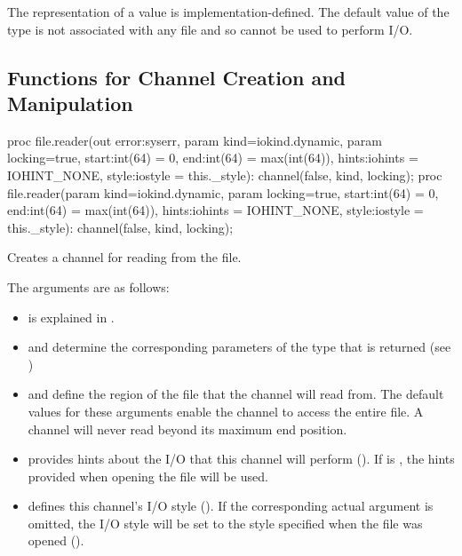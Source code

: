 The representation of a  value is implementation-defined.
The default value of the  type is not associated
with any file and so cannot be used to perform I/O.


\subsection{Functions for Channel Creation and Manipulation}
\label{IO_channel_creation}

\begin{protohead}
proc file.reader(out error:syserr, param kind=iokind.dynamic, param locking=true,
                 start:int(64) = 0, end:int(64) = max(int(64)), hints:iohints = IOHINT_NONE,
                 style:iostyle = this._style): channel(false, kind, locking);
proc file.reader(param kind=iokind.dynamic, param locking=true,
                 start:int(64) = 0, end:int(64) = max(int(64)), hints:iohints = IOHINT_NONE,
                 style:iostyle = this._style): channel(false, kind, locking);
\end{protohead}
\begin{protobody}
Creates a channel for reading from the file.

The arguments are as follows:

\begin{itemize}

\item {} is explained in .

\item {} and  determine the corresponding parameters of
      the  type that is returned (see )

\item {} and  define the region of the file that
      the channel will read from. The default values for these arguments enable
      the channel to access the entire file.
      A channel will never read beyond its maximum end position.

\item {} provides hints about the I/O that this channel
      will perform ().
      If  is , the hints provided when opening
      the file will be used.

\item {} defines this channel's I/O style ().
      If the corresponding actual argument is omitted,
      the I/O style will be set to the style specified when the file
      was opened ().

\end{itemize}

\end{protobody}

